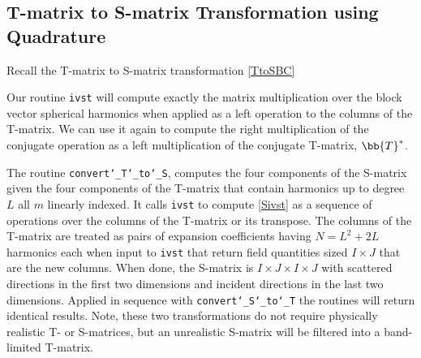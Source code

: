 {\footnotesize
{}
}



\subsection{T-matrix to S-matrix Transformation using Quadrature}
\label{fastTtoS}

Recall the T-matrix to S-matrix transformation \eqref{TtoSBC}

Our routine \texttt{ivst} will compute exactly the matrix multiplication over the block vector spherical harmonics when applied as a left operation to the columns of the T-matrix. We can use it again to compute the right multiplication of the conjugate operation as a left multiplication of the conjugate T-matrix, $\bb{T}^*$.

The routine \texttt{convert\char`_T\char`_to\char`_S}, computes the four components of the S-matrix given the four components of the T-matrix that contain harmonics up to degree $L$ all $m$ linearly indexed. It calls \texttt{ivst} to compute \eqref{Sivst} as a sequence of operations over the columns of the T-matrix or its transpose. The columns of the T-matrix are treated as pairs of expansion coefficients having $N = L^2 + 2L$ harmonics each when input to \texttt{ivst} that return field quantities sized $I \times J$ that are the new columns. When done, the S-matrix is $I \times J \times I \times J$ with scattered directions in the first two dimensions and incident directions in the last two dimensions.  Applied in sequence with \texttt{convert\char`_S\char`_to\char`_T} the routines will return identical results. Note, these two transformations do not require physically realistic T- or S-matrices, but an unrealistic S-matrix will be filtered into a band-limited T-matrix.   %


